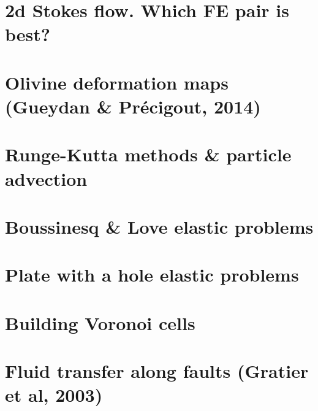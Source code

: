 \documentclass[a4paper,11pt]{report}
\begin{document}
\chapter{2d Stokes flow. Which FE pair is best? \label{f120}} %

\chapter{Olivine deformation maps (Gueydan \& Pr{\'e}cigout, 2014)  \label{f121}} %

\chapter{Runge-Kutta methods \& particle advection \label{f122}}%

\chapter{Boussinesq \& Love elastic problems\label{f123}} %

\chapter{Plate with a hole elastic problems \label{f124}} %

\chapter{Building Voronoi cells \label{f125}} %

\chapter{Fluid transfer along faults (Gratier et al, 2003)\label{f126}} %
\end{document}
